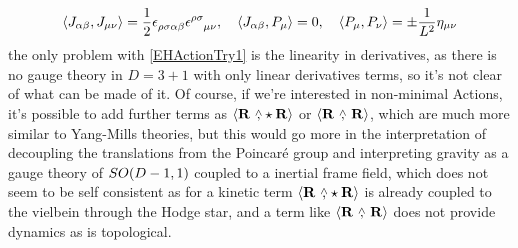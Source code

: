 \begin{align*}
    \expval{J_{\alpha\beta},J_{\mu\nu}}=\frac12\tensor{\epsilon}{_\rho_\sigma_\alpha_\beta}\tensor{\epsilon}{^\rho^\sigma_\mu_\nu},\ \ \ \expval{J_{\alpha\beta},P_\mu}=0,\ \ \ \expval{P_\mu,P_\nu}=\pm\frac{1}{L^2}\eta_{\mu\nu}
\end{align*}
the only problem with \ref{EHActionTry1} is the linearity in derivatives, as there is no gauge theory in $D=3+1$ with only linear derivatives terms, so it's not clear of what can be made of it. Of course, if we're interested in non-minimal 
Actions, it's possible to add further terms as $\expval{\vb R\ \wedgecomma\star\vb R}$ or $\expval{\vb R\ \wedgecomma\ \vb R}$, which are much more similar to Yang-Mills theories, but this would go more in the interpretation of 
decoupling the translations from the Poincaré group and interpreting gravity as a gauge theory of $SO\qty(D-1,1)$ coupled to a inertial frame field, which does not seem to be self consistent as for a kinetic term $\expval{\vb R\ \wedgecomma\star\vb R}$ 
is already coupled to the vielbein through the Hodge star, and a term like $\expval{\vb R\ \wedgecomma\ \vb R}$ does not provide dynamics as is topological.
